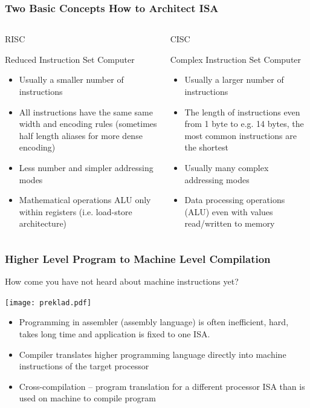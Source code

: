 \documentclass{beamer}
\begin{document}
\begin{frame}
\frametitle{Two Basic Concepts How to Architect ISA}

\begin{columns}
\begin{column}{0.5\textwidth}
\begin{center}
\LARGE{RISC}
\end{center}
Reduced Instruction Set Computer
\begin{itemize}
\item Usually a smaller number of instructions
\item All instructions have the same same width and encoding rules (sometimes half length aliases for more dense encoding)
\item Less number and simpler addressing modes
\item Mathematical operations ALU only within registers (i.e. load-store architecture)
\end{itemize}
\end{column}
\begin{column}{0.5\textwidth}  
\begin{center}
\LARGE{CISC}
\end{center}
Complex Instruction Set Computer
\begin{itemize}
\item Usually a larger number of instructions
\item The length of instructions even from 1 byte to e.g. 14 bytes, the most common instructions are the shortest
\item Usually many complex addressing modes
\item Data processing operations (ALU) even with values read/written to memory
\end{itemize}

\end{column}
\end{columns}
\end{frame}


\begin{frame}
\frametitle{Higher Level Program to Machine Level Compilation}

How come you have not heard about machine instructions yet?

\begin{center}
   \texttt{[image: preklad.pdf]}
\end{center}

\begin{itemize}
\item Programming in assembler (assembly language) is often inefficient, hard, takes long time and application is fixed to one ISA.
\item Compiler translates higher programming language directly into machine instructions of the target processor
\item Cross-compilation -- program translation for a different processor ISA than is used on machine to compile program
\end{itemize}
\end{frame}
\end{document}
